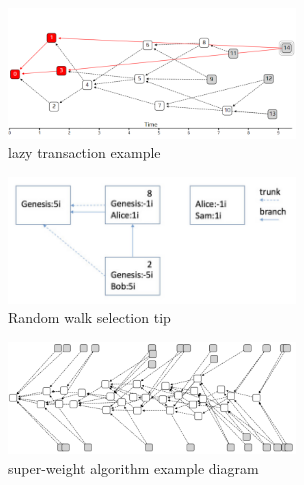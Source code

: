 \begin{figure}[H]
	\centering
	\includegraphics[width=3.0in]{figures/screenshot009.png}
	\caption{lazy transaction example}
	\label{simulationfigure}
\end{figure}

\begin{figure}[H]
	\centering
	\includegraphics[width=3.0in]{figures/screenshot010.png}
	\caption{Random walk selection tip}
	\label{simulationfigure}
\end{figure}

\begin{figure}[H]
	\centering
	\includegraphics[width=3.0in]{figures/screenshot011.png}
	\caption{super-weight algorithm example diagram}
	\label{simulationfigure}
\end{figure}

